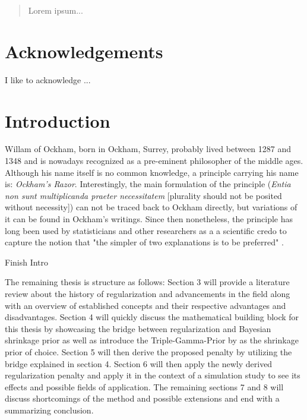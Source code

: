 \documentclass[12pt,a4paper]{article}
\newenvironment{lightbluebox}{%
    \begin{tcolorbox}[colback=lightblue, colframe=lightblue, fontupper=\itshape]%
}{%
    \end{tcolorbox}%
}
\begin{document}
\begin{abstract}
Lorem ipsum...
\end{abstract}

\clearpage

\section*{Acknowledgements}
\thispagestyle{empty}

I like to acknowledge ...

\clearpage

\thispagestyle{plain}
\tableofcontents
\pagebreak
{}

\pagebreak
\section{Introduction}
Willam of Ockham, born in Ockham, Surrey, probably lived between 1287 and 1348 and is nowadays recognized as a pre-eminent philosopher of the middle ages. Although     his name itself is no common knowledge, a principle carrying his name is: \textit{Ockham's Razor}. Interestingly, the main formulation of the principle (\textit{Entia non sunt multiplicanda praeter necessitatem} [plurality should not be posited without necessity]) can not be traced back to Ockham directly, but variations of it can be found in Ockham's writings. Since then nonetheless, the principle has long been used by statisticians and other researchers as a a scientific credo to capture the notion that "the simpler of two explanations is to be preferred" \parencite{Lazar2010}.  

\begin{lightbluebox}
Finish Intro
\end{lightbluebox}

The remaining thesis is structure as follows: Section 3 will provide a literature review about the history of regularization and advancements in the field along with an overview of established concepts and their respective advantages and disadvantages. Section 4 will quickly discuss the mathematical building block for this thesis by showcasing the bridge between regularization and Bayesian shrinkage prior as well as introduce the Triple-Gamma-Prior by \textcite{TGP2020} as the shrinkage prior of choice. Section 5 will then derive the proposed penalty by utilizing the bridge explained in section 4. Section 6 will then apply the newly derived regularization penalty and apply it in the context of a simulation study to see its effects and possible fields of application. The remaining sections 7 and 8 will discuss shortcomings of the method and possible extensions and end with a summarizing conclusion. 
\end{document}
